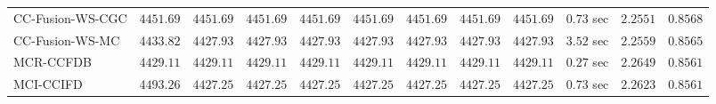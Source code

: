 \begin{table}[H]
\begin{tabular}{lrrrrrrrrrrr}
    CC-Fusion-WS-CGC & $      4451.69$ & $      4451.69$ & $      4451.69$ & $      4451.69$ & $      4451.69$ & $      4451.69$ & $      4451.69$ & $      4451.69$ & $         0.73$ sec    & $       2.2551$  & $       0.8568$ \\ 
     CC-Fusion-WS-MC & $      4433.82$ & $      4427.93$ & $      4427.93$ & $      4427.93$ & $      4427.93$ & $      4427.93$ & $      4427.93$ & $      4427.93$ & $         3.52$ sec    & $       2.2559$  & $       0.8565$ \\ 
\cmidrule{1-1} 
           MCR-CCFDB & $      4429.11$ & $      4429.11$ & $      4429.11$ & $      4429.11$ & $      4429.11$ & $      4429.11$ & $      4429.11$ & $      4429.11$ & $         0.27$ sec    & $       2.2649$  & $       0.8561$ \\ 
\cmidrule{1-1} 
           MCI-CCIFD & $      4493.26$ & $      4427.25$ & $      4427.25$ & $      4427.25$ & $      4427.25$ & $      4427.25$ & $      4427.25$ & $      4427.25$ & $         0.73$ sec    & $       2.2623$  & $       0.8561$ \\ 
\bottomrule
\end{tabular}
\end{table}

